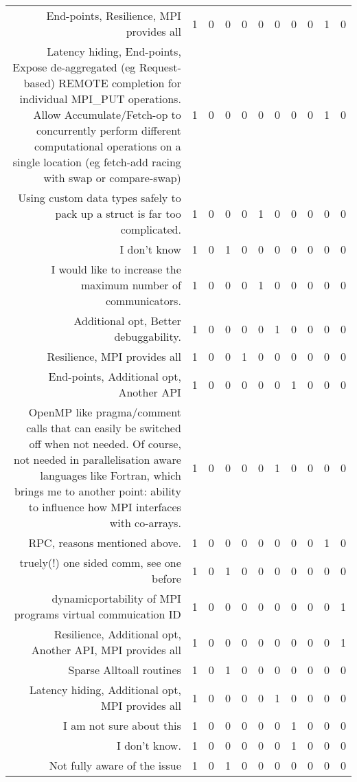 {\begin{landscape}
\begin{longtable}[htb]{r|c|c|c|c|c|c|c|c|c|c}
{End-points, Resilience, MPI provides all} & 1 & 0 & 0 & 0 & 0 & 0 & 0 & 0 & 1 & 0 \\%
{Latency hiding, End-points, Expose de-aggregated (eg Request-based) REMOTE completion for individual MPI\_PUT operations. Allow Accumulate/Fetch-op to concurrently perform different computational operations on a single location (eg fetch-add racing with swap or compare-swap)} & 1 & 0 & 0 & 0 & 0 & 0 & 0 & 0 & 1 & 0 \\%
{Using custom data types safely to pack up a struct is far too complicated.} & 1 & 0 & 0 & 0 & 1 & 0 & 0 & 0 & 0 & 0 \\%
{I don't know} & 1 & 0 & 1 & 0 & 0 & 0 & 0 & 0 & 0 & 0 \\%
{I would like to increase the maximum number of communicators.} & 1 & 0 & 0 & 0 & 1 & 0 & 0 & 0 & 0 & 0 \\%
{Additional opt, Better debuggability.} & 1 & 0 & 0 & 0 & 0 & 1 & 0 & 0 & 0 & 0 \\%
{Resilience, MPI provides all} & 1 & 0 & 0 & 1 & 0 & 0 & 0 & 0 & 0 & 0 \\%
{End-points, Additional opt, Another API} & 1 & 0 & 0 & 0 & 0 & 0 & 1 & 0 & 0 & 0 \\%
{OpenMP like pragma/comment calls that can easily be switched off when not needed. Of course, not needed in parallelisation aware languages like Fortran, which brings me to another point: ability to influence how MPI interfaces with co-arrays.} & 1 & 0 & 0 & 0 & 0 & 1 & 0 & 0 & 0 & 0 \\%
{RPC, reasons mentioned above.} & 1 & 0 & 0 & 0 & 0 & 0 & 0 & 0 & 1 & 0 \\%
{truely(!) one sided comm, see one before} & 1 & 0 & 1 & 0 & 0 & 0 & 0 & 0 & 0 & 0 \\%
{dynamicportability of MPI programs virtual commuication ID} & 1 & 0 & 0 & 0 & 0 & 0 & 0 & 0 & 0 & 1 \\%
{Resilience, Additional opt, Another API, MPI provides all} & 1 & 0 & 0 & 0 & 0 & 0 & 0 & 0 & 0 & 1 \\%
{Sparse Alltoall routines} & 1 & 0 & 1 & 0 & 0 & 0 & 0 & 0 & 0 & 0 \\%
{Latency hiding, Additional opt, MPI provides all} & 1 & 0 & 0 & 0 & 0 & 1 & 0 & 0 & 0 & 0 \\%
{I am not sure about this} & 1 & 0 & 0 & 0 & 0 & 0 & 1 & 0 & 0 & 0 \\%
{I don't know.} & 1 & 0 & 0 & 0 & 0 & 0 & 1 & 0 & 0 & 0 \\%
{Not fully aware of the issue} & 1 & 0 & 1 & 0 & 0 & 0 & 0 & 0 & 0 & 0 \\%

\end{longtable}
\end{landscape}}
